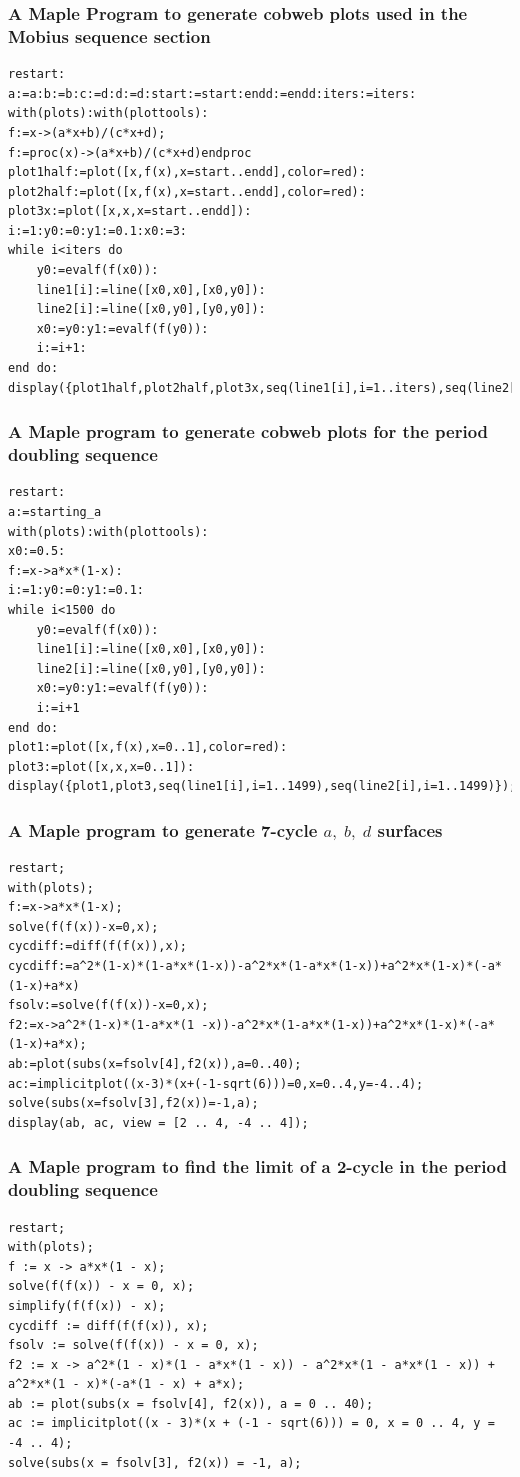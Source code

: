 \documentclass[12pt]{article}
\begin{document}
\subsubsection{A Maple Program to generate cobweb plots used in the Mobius sequence section}
\begin{lstlisting}
restart:
a:=a:b:=b:c:=d:d:=d:start:=start:endd:=endd:iters:=iters:
with(plots):with(plottools):
f:=x->(a*x+b)/(c*x+d);
f:=proc(x)->(a*x+b)/(c*x+d)endproc
plot1half:=plot([x,f(x),x=start..endd],color=red):
plot2half:=plot([x,f(x),x=start..endd],color=red):
plot3x:=plot([x,x,x=start..endd]):
i:=1:y0:=0:y1:=0.1:x0:=3:
while i<iters do
	y0:=evalf(f(x0)):
	line1[i]:=line([x0,x0],[x0,y0]):
	line2[i]:=line([x0,y0],[y0,y0]):
	x0:=y0:y1:=evalf(f(y0)):
	i:=i+1:
end do:
display({plot1half,plot2half,plot3x,seq(line1[i],i=1..iters),seq(line2[i],i=1..iters)});
\end{lstlisting}
\subsubsection{A Maple program to generate cobweb plots for the period doubling sequence}
\begin{lstlisting}
restart:
a:=starting_a
with(plots):with(plottools):
x0:=0.5:
f:=x->a*x*(1-x):
i:=1:y0:=0:y1:=0.1:
while i<1500 do
	y0:=evalf(f(x0)):
	line1[i]:=line([x0,x0],[x0,y0]):
	line2[i]:=line([x0,y0],[y0,y0]):
	x0:=y0:y1:=evalf(f(y0)):
	i:=i+1
end do:
plot1:=plot([x,f(x),x=0..1],color=red):
plot3:=plot([x,x,x=0..1]):
display({plot1,plot3,seq(line1[i],i=1..1499),seq(line2[i],i=1..1499)});
\end{lstlisting}
\subsubsection{A Maple program to generate 7-cycle $a,\;b,\;d$ surfaces}
\begin{lstlisting}
restart;
with(plots);
f:=x->a*x*(1-x);
solve(f(f(x))-x=0,x);
cycdiff:=diff(f(f(x)),x);
cycdiff:=a^2*(1-x)*(1-a*x*(1-x))-a^2*x*(1-a*x*(1-x))+a^2*x*(1-x)*(-a*(1-x)+a*x)
fsolv:=solve(f(f(x))-x=0,x);
f2:=x->a^2*(1-x)*(1-a*x*(1 -x))-a^2*x*(1-a*x*(1-x))+a^2*x*(1-x)*(-a*(1-x)+a*x);
ab:=plot(subs(x=fsolv[4],f2(x)),a=0..40);
ac:=implicitplot((x-3)*(x+(-1-sqrt(6)))=0,x=0..4,y=-4..4);
solve(subs(x=fsolv[3],f2(x))=-1,a);
display(ab, ac, view = [2 .. 4, -4 .. 4]);
\end{lstlisting}
\subsubsection{A Maple program to find the limit of a 2-cycle in the period doubling sequence}
\begin{lstlisting}
restart;
with(plots);
f := x -> a*x*(1 - x);
solve(f(f(x)) - x = 0, x);
simplify(f(f(x)) - x);
cycdiff := diff(f(f(x)), x);
fsolv := solve(f(f(x)) - x = 0, x);
f2 := x -> a^2*(1 - x)*(1 - a*x*(1 - x)) - a^2*x*(1 - a*x*(1 - x)) + a^2*x*(1 - x)*(-a*(1 - x) + a*x);
ab := plot(subs(x = fsolv[4], f2(x)), a = 0 .. 40);
ac := implicitplot((x - 3)*(x + (-1 - sqrt(6))) = 0, x = 0 .. 4, y = -4 .. 4);
solve(subs(x = fsolv[3], f2(x)) = -1, a);
\end{lstlisting}
\newpage
\end{document}
